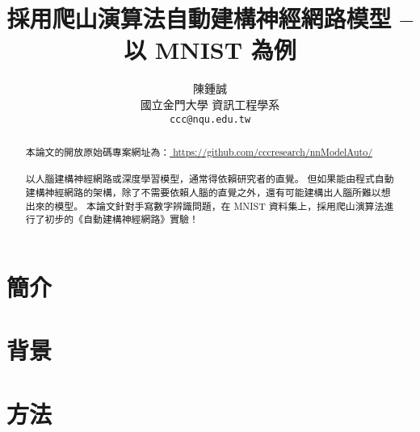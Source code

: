 \documentclass{article}
\title{採用爬山演算法自動建構神經網路模型 -- 以 MNIST 為例}
\author{
  陳鍾誠 \\
  國立金門大學 資訊工程學系\\
  \texttt{ccc@nqu.edu.tw} \\
}
\begin{document}
\maketitle

\begin{abstract}
本論文的開放原始碼專案網址為：\url{ https://github.com/cccresearch/nnModelAuto/ }
\\
\\
以人腦建構神經網路或深度學習模型，通常得依賴研究者的直覺。
但如果能由程式自動建構神經網路的架構，除了不需要依賴人腦的直覺之外，還有可能建構出人腦所難以想出來的模型。
本論文針對手寫數字辨識問題，在 MNIST 資料集上，採用爬山演算法進行了初步的《自動建構神經網路》實驗！
\end{abstract}




\section{簡介}

\section{背景}

\section{方法}


\renewcommand\refname{參考文獻}

  


\begin{thebibliography}{1}


\end{thebibliography}
\end{document}
